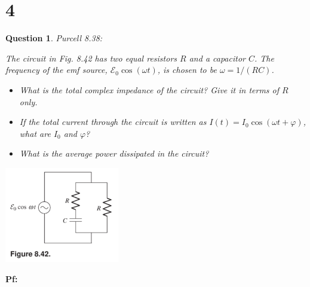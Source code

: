 \documentclass{article}
\newtheorem{question}{Question}
\begin{document}
\section*{4}
\begin{myBox}[]{}
    \begin{question} Purcell 8.38:

        The circuit in Fig. 8.42 has two equal resistors $R$ and a capacitor $C$.
        The frequency of the emf source, $\mathcal{E}_0\cos(\omega t)$, is chosen to be $\omega=1/(RC)$.
        \begin{itemize}
        \item[(a)] What is the total complex impedance of the circuit? Give it in
        terms of $R$ only.
        \item[(b)] If the total current through the circuit is written as $I(t)=I_0\cos(\omega t+\varphi)$, what are $I_0$ and $\varphi$?
        \item[(c)] What is the average power dissipated in the circuit?
        \end{itemize}
    \end{question}

    \begin{center}
        \includegraphics*[width=50mm]{8.38.png}
    \end{center}
\end{myBox}

\textbf{Pf:}
\end{document}
